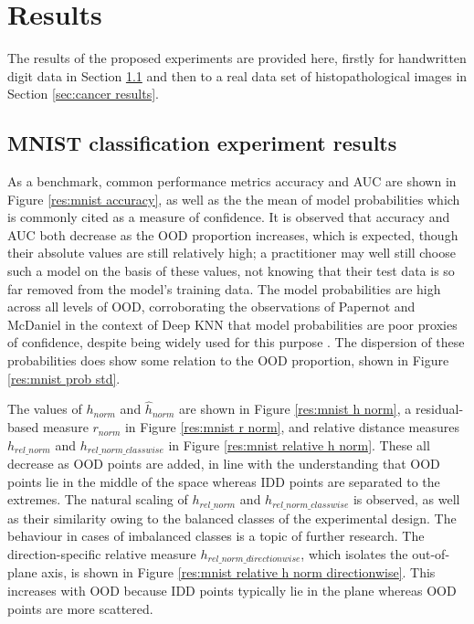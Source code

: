\documentclass{article}
\begin{document}
\section{Results}
\label{sec:results section}
The results of the proposed experiments are provided here, firstly for handwritten digit data in Section \ref{sec:mnist results} and then to a real data set of histopathological images in Section \ref{sec:cancer results}.


\subsection{MNIST classification experiment results}
\label{sec:mnist results}
As a benchmark, common performance metrics accuracy and AUC are shown in Figure \ref{res:mnist accuracy}, as well as the the mean of model probabilities which is commonly cited as a measure of confidence. It is observed that accuracy and AUC both decrease as the OOD proportion increases, which is expected, though their absolute values are still relatively high; a practitioner may well still choose such a model on the basis of these values, not knowing that their test data is so far removed from the model's training data.
The model probabilities are high across all levels of OOD, corroborating the observations of Papernot and McDaniel in the context of Deep KNN that model probabilities are poor proxies of confidence, despite being widely used for this purpose \cite{papernot_deep_2018}. The dispersion of these probabilities does show some relation to the OOD proportion, shown in Figure \ref{res:mnist prob std}.

The values of $h_{norm}$ and $\hat{h}_{norm}$ are shown in Figure \ref{res:mnist h norm}, a residual-based measure $r_{norm}$ in Figure \ref{res:mnist r norm}, and relative distance measures $h_{rel\_norm}$ and $h_{rel\_norm\_classwise}$ in Figure \ref{res:mnist relative h norm}.
These all decrease as OOD points are added, in line with the understanding that OOD points lie in the middle of the space whereas IDD points are separated to the extremes.
The natural scaling of $h_{rel\_norm}$ and $h_{rel\_norm\_classwise}$ is observed, as well as their similarity owing to the balanced classes of the experimental design. The behaviour in cases of imbalanced classes is a topic of further research.
The direction-specific relative measure $h_{rel\_norm\_directionwise}$, which isolates the out-of-plane axis, is shown in Figure \ref{res:mnist relative h norm directionwise}.
This increases with OOD because IDD points typically lie in the plane whereas OOD points are more scattered.
\end{document}
